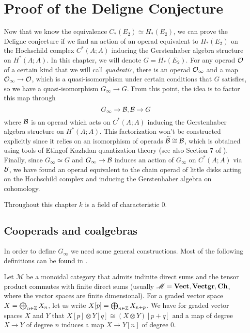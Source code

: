 \documentclass[TFM.tex]{subfiles}
\begin{document}
\chapter{Proof of the Deligne Conjecture}


Now that we know the equivalence $C_*(E_2)\simeq H_*(E_2)$, we can prove the Deligne conjecture if we find an action of an operad equivalent to $H_*(E_2)$ on the Hochschild complex $C^*(A;A)$ inducing the Gerstenhaber algebra structure on $H^*(A;A)$. In this chapter, we will denote $G=H_*(E_2)$. For any operad ${\mathcal O}$ of a certain kind that we will call \emph{quadratic}, there is an operad ${\mathcal O}_\infty$ and a map ${\mathcal O}_\infty\to{\mathcal O}$, which is a quasi-isomorphism under certain conditions that $G$ satisfies, so we have a quasi-isomorphism $G_\infty\to G$. From this point, the idea is to factor this map through
\[
G_\infty\to \mathcal{B},\mathcal{B}\to G
\]
where $\mathcal{B}$ is an operad which acts on $C^*(A;A)$ inducing the Gerstenhaber algebra structure on $H^*(A;A)$.  This factorization won't be constructed explicitly since it relies on an isomorphism of operads $\widetilde{\mathcal{B}}\cong\mathcal{B}$, which is obtained using tools of Etingof-Kazhdan quantization theory \cite{EK} (see also Section 7 of \cite{Hinich}). Finally, since $G_\infty\simeq G$ and $G_\infty\to\mathcal{B}$ induces an action of $G_\infty$ on $C^*(A;A)$ via $\mathcal{B}$, we have found an operad equivalent to the chain operad of little disks acting on the Hochschild complex and inducing the Gerstenhaber algebra on cohomology. 

Throughout this chapter $k$ is a field of characteristic 0. 


\section{Cooperads and coalgebras}


In order to define $G_\infty$ we need some general constructions. Most of the following definitions can be found in \cite{Hinich}. 

Let $\mathscr{M}$ be a monoidal category that admits indinite direct sums and the tensor product commutes with finite direct sums (usually $\mathscr{M}=\mathrm{\mathbf{Vect}}, \mathrm{\mathbf{Vectgr}},\mathrm{\mathbf{Ch}}$, where the vector spaces are finite dimensional). For a graded vector space $X=\bigoplus_{n\in\mathbb{Z}}X_n$, let us write $X[p]=\bigoplus_{n\in\mathbb{Z}}X_{n+p}$. We have for graded vector spaces $X$ and $Y$ that $X[p]\otimes Y[q]\cong (X\otimes Y)[p+q]$ and a map of degree $X\to Y$ of degree $n$ induces a map $X\to Y[n]$ of degree 0. 
\end{document}
